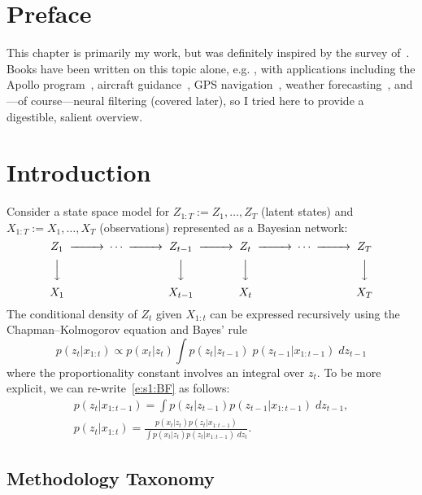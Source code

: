 
\section{Preface}
This chapter is primarily my work, but was definitely inspired by the survey of~\textcite{Che13}.  Books have been written on this topic alone, e.g. \textcite{Wie49,Jaz70,And79,Str90,Sar13}, with applications including the Apollo program~\cite{Hal66, Bat70, Gre10}, aircraft guidance~\cite{Sch70}, GPS navigation~\cite{Hof01}, weather forecasting~\cite{Bue17}, and---of course---neural filtering (covered later), so I tried here to provide a digestible, salient overview.  

\section{Introduction}
Consider a state space model for $Z_{1:T}:=Z_1,\dotsc,Z_T$ (latent states) and $X_{1:T}:=X_1,\dotsc,X_T$ (observations) represented as a Bayesian network:
\[
\begin{CD}
Z_1 @>>> \cdots @>>>  Z_{t-1} @>>> Z_t @>>> \cdots  @>>> Z_T \\
@VVV @.	@VVV @VVV @. @VVV \\
X_1  @. @. X_{t-1} @. X_t @. @. X_T
\end{CD}
\]
The conditional density of $Z_t$ given $X_{1:t}$ can be expressed recursively using the Chapman--Kolmogorov equation and Bayes' rule \cite{Che03}
\begin{equation} \label{e:s1:BF}
p(z_t|x_{1:t}) \propto p(x_t|z_t) \int p(z_t|z_{t-1})\; p(z_{t-1}|x_{1:t-1}) \; dz_{t-1}
\end{equation}
where the proportionality constant involves an integral over $z_t$.  To be more explicit, we can re-write~\eqref{e:s1:BF} as follows:
\begin{subequations} \label{e:s1:BFalt}
\begin{gather} p(z_t|x_{1:t-1}) = \textstyle \int p(z_t|z_{t-1}) p(z_{t-1}|x_{1:t-1}) \; dz_{t-1} , \label{e:s1:BFa} \\
p(z_t|x_{1:t}) = \frac{p(x_t|z_t)p(z_t|x_{1:t-1})}{\int p(x_t|z_t) p(z_t|x_{1:t-1}) \; dz_t}. \label{e:s1:BFb}
\end{gather}  
\end{subequations}

\subsection{Methodology Taxonomy}

